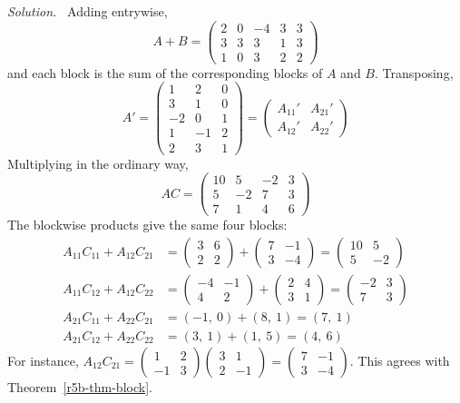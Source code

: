 \documentclass[12pt]{article}
\theoremstyle{definition}
\newenvironment{solution}{\par\noindent\textit{Solution.}\ }{\par\smallskip}
\begin{document}
\begin{solution}
Adding entrywise,
\[
A+B=\left(\begin{array}{ccc|cc}2&0&-4&3&3\\3&3&3&1&3\\\hline1&0&3&2&2\end{array}\right)
\]
and each block is the sum of the corresponding blocks of \(A\) and \(B\). Transposing,
\[
A'=\left(\begin{array}{cc|c}1&2&0\\3&1&0\\-2&0&1\\\hline1&-1&2\\2&3&1\end{array}\right)
=\begin{pmatrix}A_{11}'&A_{21}'\\A_{12}'&A_{22}'\end{pmatrix}
\]
Multiplying in the ordinary way,
\[
AC=\left(\begin{array}{cc|cc}10&5&-2&3\\5&-2&7&3\\\hline7&1&4&6\end{array}\right)
\]
The blockwise products give the same four blocks:
\[
\begin{aligned}
A_{11}C_{11}+A_{12}C_{21}&=\begin{pmatrix}3&6\\2&2\end{pmatrix}+\begin{pmatrix}7&-1\\3&-4\end{pmatrix}=\begin{pmatrix}10&5\\5&-2\end{pmatrix}\\
A_{11}C_{12}+A_{12}C_{22}&=\begin{pmatrix}-4&-1\\4&2\end{pmatrix}+\begin{pmatrix}2&4\\3&1\end{pmatrix}=\begin{pmatrix}-2&3\\7&3\end{pmatrix}\\
A_{21}C_{11}+A_{22}C_{21}&=(-1,\ 0)+(8,\ 1)=(7,\ 1)\\
A_{21}C_{12}+A_{22}C_{22}&=(3,\ 1)+(1,\ 5)=(4,\ 6)
\end{aligned}
\]
For instance,
\(A_{12}C_{21}=\left(\begin{smallmatrix}1&2\\-1&3\end{smallmatrix}\right)\left(\begin{smallmatrix}3&1\\2&-1\end{smallmatrix}\right)=\left(\begin{smallmatrix}7&-1\\3&-4\end{smallmatrix}\right)\).
This agrees with Theorem~\ref{r5b-thm-block}.
\end{solution}
\end{document}

